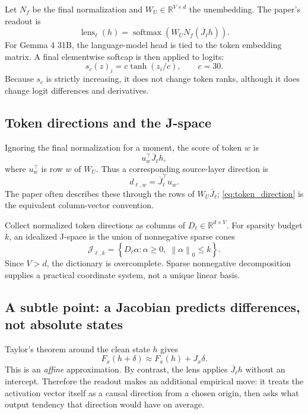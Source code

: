 \documentclass[11pt]{article}
\newcommand{\R}{\mathbb{R}}
\newcommand{\softmax}{\operatorname{softmax}}
\newcommand{\Jbar}{\overline{J}}
\newcommand{\Norm}[1]{\left\lVert #1 \right\rVert}
\theoremstyle{definition}
\theoremstyle{remark}
\begin{document}
Let $N_f$ be the final normalization and $W_U\in\R^{V\times d}$ the unembedding. The paper's readout is
\begin{equation}
  \operatorname{lens}_\ell(h)
  = \softmax\!\left(W_U N_f(\Jbar_\ell h)\right).
  \label{eq:lens}
\end{equation}
For Gemma 4 31B, the language-model head is tied to the token embedding matrix. A final elementwise softcap is then applied to logits:
\begin{equation}
  s_c(z)_i = c\tanh(z_i/c),
  \qquad c=30.
  \label{eq:softcap}
\end{equation}
Because $s_c$ is strictly increasing, it does not change token ranks, although it does change logit differences and derivatives.

\subsection{Token directions and the J-space}
Ignoring the final normalization for a moment, the score of token $w$ is
\[
  u_w^\top \Jbar_\ell h,
\]
where $u_w^\top$ is row $w$ of $W_U$. Thus a corresponding source-layer direction is
\begin{equation}
  d_{\ell,w} = \Jbar_\ell^\top u_w.
  \label{eq:token_direction}
\end{equation}
The paper often describes these through the rows of $W_U\Jbar_\ell$; 
\cref{eq:token_direction} is the equivalent column-vector convention.

Collect normalized token directions as columns of $D_\ell\in\R^{d\times V}$. For sparsity budget $k$, an idealized J-space is the union of nonnegative sparse cones
\begin{equation}
  \mathcal{J}_{\ell,k}
  = \left\{D_\ell\alpha:
      \alpha\ge 0,\; \Norm{\alpha}_0\le k\right\}.
  \label{eq:jspace}
\end{equation}
Since $V>d$, the dictionary is overcomplete. Sparse nonnegative decomposition supplies a practical coordinate system, not a unique linear basis.

\subsection{A subtle point: a Jacobian predicts differences, not absolute states}
Taylor's theorem around the clean state $h$ gives
\begin{equation}
  F_x(h+\delta)
  \approx F_x(h)+J_x\delta.
  \label{eq:affine_taylor}
\end{equation}
This is an \emph{affine} approximation. By contrast, the lens applies $\Jbar_\ell h$ without an intercept. Therefore the readout makes an additional empirical move: it treats the activation vector itself as a causal direction from a chosen origin, then asks what output tendency that direction would have on average.
\end{document}
